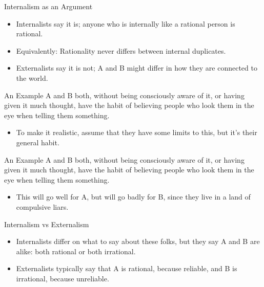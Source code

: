 \documentclass[
  17pt,
  letterpaper,
  ignorenonframetext,
  aspectratio=169,
]{beamer}
\providecommand{\tightlist}{%
  \setlength{\itemsep}{0pt}\setlength{\parskip}{0pt}}\usepackage{longtable,booktabs,array}
\begin{document}
\begin{frame}{Internalism as an Argument}
\protect\hypertarget{internalism-as-an-argument-1}{}
\begin{itemize}[<+->]
\tightlist
\item
  Internalists say it is; anyone who is internally like a rational
  person is rational.
\item
  Equivalently: Rationality never differs between internal duplicates.
\item
  Externalists say it is not; A and B might differ in how they are
  connected to the world.
\end{itemize}
\end{frame}

\begin{frame}{An Example}
\protect\hypertarget{an-example}{}
A and B both, without being consciously aware of it, or having given it
much thought, have the habit of believing people who look them in the
eye when telling them something.

\begin{itemize}[<+->]
\tightlist
\item
  To make it realistic, assume that they have some limits to this, but
  it's their general habit.
\end{itemize}
\end{frame}

\begin{frame}{An Example}
\protect\hypertarget{an-example-1}{}
A and B both, without being consciously aware of it, or having given it
much thought, have the habit of believing people who look them in the
eye when telling them something.

\begin{itemize}[<+->]
\tightlist
\item
  This will go well for A, but will go badly for B, since they live in a
  land of compulsive liars.
\end{itemize}
\end{frame}

\begin{frame}{Internalism vs Externalism}
\protect\hypertarget{internalism-vs-externalism}{}
\begin{itemize}[<+->]
\tightlist
\item
  Internalists differ on what to say about these folks, but they say A
  and B are alike: both rational or both irrational.
\item
  Externalists typically say that A is rational, because reliable, and B
  is irrational, because unreliable.
\end{itemize}
\end{frame}
\end{document}
